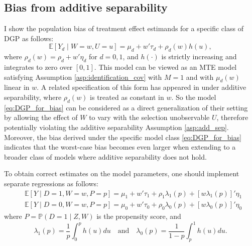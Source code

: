 \documentclass[11pt]{article}
\theoremstyle{definition}
\newcommand{\Exp}{\ensuremath{\mathbb{E}}} %
\newcommand{\Prob}{\ensuremath{\mathbb{P}}} %
\newcommand{\0}{\ensuremath{\mathbf{0}}}
\begin{document}
\begin{bibunit}
\subsection{Bias from additive separability}
\label{sec:bias_add_sep}
I show the population bias of treatment effect estimands for a specific class of DGP as follows:
\begin{equation}
\label{eq:DGP_for_bias}
    \Exp[Y_d \mid W = w, U = u] = \mu_d + w'\tau_d + \rho_d(w) h(u),
\end{equation}
where $\rho_d(w) = \rho_d + w'\eta_d$ for $d = 0,1$, and $h(\cdot)$ is strictly increasing and integrates to zero over $[0,1]$. This model can be viewed as an MTE model satisfying Assumption \ref{asp:identification_cov} with $M=1$ and with $\mu_d(w)$ linear in $w$. A related specification of this form has appeared in \citet[equation (12)]{kline/walters:2019} under additive separability, where $\rho_d(w)$ is treated as constant in $w$. So the model \eqref{eq:DGP_for_bias} can be considered as a direct generalization of their setting by allowing the effect of $W$ to vary with the selection unobservable $U$, therefore potentially violating the additive separability Assumption \ref{asp:add_sep}. Moreover, the bias derived under the specific model class \eqref{eq:DGP_for_bias} indicates that the worst-case bias becomes even larger when extending to a broader class of models where additive separability does not hold.



To obtain correct estimates on the model parameters, one should implement separate regressions as follows:
\begin{equation}
\label{eq:longreg}
\begin{aligned}
    &\Exp[Y\mid D=1, W=w, P=p] = \mu_1 + w'\tau_1 + \rho_1 \lambda_1(p) + [w\lambda_1(p)]'\eta_1 \\
    &\Exp[Y\mid D=0, W=w, P=p] = \mu_0 + w'\tau_0 + \rho_0 \lambda_0(p) + [w\lambda_0(p)]'\eta_0
\end{aligned}
\end{equation}
where $P = \Prob(D=1\mid Z, W)$ is the propensity score, and
\[
    \lambda_1(p) = \frac{1}{p} \int_0^p h(u) du
    \quad \text{and} \quad
    \lambda_0(p) = \frac{1}{1-p} \int_p^1 h(u) du.
\]


\end{bibunit}
\end{document}
